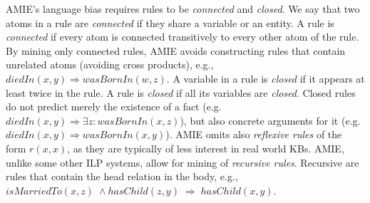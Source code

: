 AMIE's language bias requires rules to be \emph{connected} and \emph{closed}. We say that two atoms in a rule are \emph{connected} if they share a variable or an entity.
A rule is \emph{connected} if every atom is connected transitively to every other atom of the rule.
By mining only connected rules, AMIE avoids constructing rules that contain unrelated atoms (avoiding cross products), e.g., $diedIn(x,y)\Rightarrow wasBornIn(w,z)$.
A variable in a rule is \emph{closed} if it appears at least twice in the rule. A rule is \emph{closed} if all its variables are \emph{closed}.
Closed rules do not predict merely the existence of a fact (e.g. $diedIn(x,y)\Rightarrow \exists z:wasBornIn(x,z)$),
but also concrete arguments for it (e.g. $diedIn(x,y)\Rightarrow wasBornIn(x,y)$).
AMIE omits also \emph{reflexive rules} of the form $r(x, x)$, as they are typically of less interest in real world KBs.
AMIE, unlike some other ILP systems, allow for mining of \emph{recursive rules}. Recursive are rules that contain the head relation in the body, 
e.g., $isMarriedTo(x,z)\; \wedge hasChild(z,y)\; \Rightarrow\; hasChild(x,y)$. 



